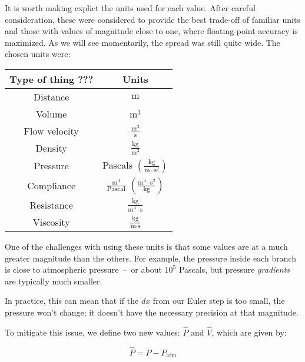 It is worth making explict the units used for each value. After careful consideration, these were
considered to provide the best trade-off of familiar units and those with values of magnitude close
to one, where floating-point accuracy is maximized. As we will see momentarily, the spread was still
quite wide. The chosen units were:

{
    \renewcommand{\arraystretch}{1.6}
    \begin{table}[h]
    \centering
    \begin{tabular}{ |c|c| }
        \hline
        Type of thing ??? & Units \\
        \hline \hline
        Distance & $\text{m}$ \\
        \hline
        Volume & $\text{m}^3$ \\
        \hline
        Flow velocity & $\frac{ \text{m}^3 }{ \text{s} }$ \\
        \hline
        Density & $\frac{ \text{kg} }{ \text{m}^3 }$ \\
        \hline
        Pressure & Pascals $\left( \frac{ \text{kg} }{ \text{m} \cdot \text{s}^2 } \right)$ \\
        \hline
        Compliance & $\frac{ \text{m}^3 }{ \text{Pascal} }$ $\left( \frac{ \text{m}^4 \cdot \text{s}^2 }{ \text{kg} } \right)$ \\
        \hline
        Resistance & $\frac{ \text{kg} }{ \text{m}^4 \cdot \text{s} }$ \\
        \hline
        Viscosity & $\frac{ \text{kg} }{ \text{m} \cdot \text{s} }$ \\
        \hline
    \end{tabular}
    \end{table}
}

One of the challenges with using these units is that some values are at a much greater magnitude
than the others. For example, the pressure inside each branch is close to atmospheric pressure~--~or
about $10^5$ Pascals, but pressure \textit{gradients} are typically much smaller.

In practice, this can mean that if the $dx$ from our Euler step is too small, the pressure won't
change; it doesn't have the necessary precision at that magnitude.

\breakpars

To mitigate this issue, we define two new values: $\hat{P}$ and $\hat{V}$, which are given by:

\begin{equation}
    \hat{P} = P - P_{\text{atm}}
\end{equation}


